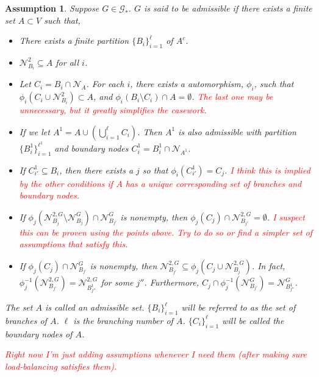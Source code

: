 \documentclass[12pt]{article}
\newcommand{\mc}{\mathcal}
\newcommand{\tr}{\textcolor{red}}
\newcommand{\ind}{\hspace{24pt}}
\newcommand{\neigh}[1]{\mc{N}_{#1}}				%
\newcommand{\dneigh}[1]{\mc{N}^2_{#1}}			%
\newcommand{\gneigh}[2]{\mc{N}^{#1}_{#2}}			%
\newcommand{\dgneigh}[2]{\mc{N}^{2,#1}_{#2}}		%
\newcommand{\indx}[1]{^{#1}}						%
\newcommand{\psize}{\ell}							%
\newcommand{\Gs}{\mc{G}_\ast}						%
\newtheorem{assu}{Assumption}
\begin{document}
\begin{assu}
Suppose \(G \in \Gs\). \(G\) is said to be admissible if there exists a finite set \(A \subset V\) such that,

\begin{itemize}
\item There exists a finite partition \(\{B_i\}_{i=1}^\psize\) of \(A^c\).

\item \(\dneigh{B_i} \subseteq A\) for all \(i\).

\item Let \(C_i = B_i\cap\neigh{A}\). For each \(i\), there exists a automorphism, \(\phi_i\), such that \(\phi_i(C_i\cup \dneigh{B_i}) \subset A\), and \(\phi_i(B_i\setminus C_i)\cap A = \emptyset\). \tr{The last one may be unnecessary, but it greatly simplifies the casework.}

\item If we let \(A\indx{1} = A\cup \left(\bigcup_{i=1}^\psize C_i\right)\). Then \(A\indx{1}\) is also admissible with partition \(\{B\indx{1}_i\}_{i=1}^{\psize\indx{1}}\) and boundary nodes \(C\indx{1}_i = B\indx{1}_i\cap \neigh{A\indx{1}}\).

\item If \(C\indx{1}_{i'} \subseteq B_i\), then there exists a \(j\) so that \(\phi_i(C\indx{1}_{i'}) = C_j\). \tr{I think this is implied by the other conditions if \(A\) has a unique corresponding set of branches and boundary nodes.}

\item If \(\phi_j(\dgneigh{G}{B_j}\setminus\gneigh{G}{B_j})\cap\gneigh{G}{B_{j'}}\) is nonempty, then \(\phi_j(C_j)\cap\dgneigh{G}{B_{j'}} = \emptyset\). \tr{I suspect this can be proven using the points above. Try to do so or find a simpler set of assumptions that satisfy this.}

\item If \(\phi_j(C_j) \cap \gneigh{G}{B_{j'}}\) is nonempty, then \(\dgneigh{G}{B_{j'}} \subseteq \phi_j(C_j\cup\dgneigh{G}{B_j})\). In fact, \(\phi_j^{-1}(\dgneigh{G}{B_{j'}}) = \dgneigh{G}{B_{j''}\indx{1}}\) for some \(j''\). Furthermore, \(C_j\cap\phi_j^{-1}(\gneigh{G}{B_{j'}}) = \gneigh{G}{B_{j''}\indx{1}}\).
\end{itemize}

The set \(A\) is called an admissible set. \(\{B_i\}_{i=1}^\psize\) will be referred to as the set of branches of \(A\). \(\psize\) is the branching number of \(A\). \(\{C_i\}_{i=1}^\psize\) will be called the boundary nodes of \(A\).

\ind \tr{Right now I'm just adding assumptions whenever I need them (after making sure load-balancing satisfies them).}
\label{a::admissible}
\end{assu}
\end{document}

